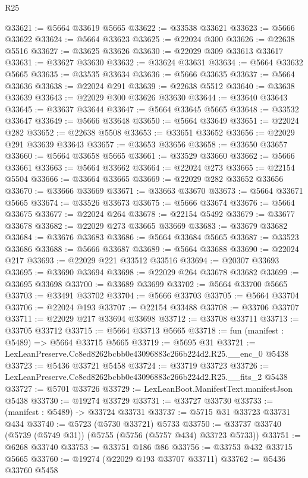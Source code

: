 \begin{lexlean}{R25}
\begin{coremodule}
@33621 := @5664 @33619 @5665
@33622 := @33538 @33621
@33623 := @5666 @33622
@33624 := @5664 @33623
@33625 := @22024 @300
@33626 := @22638 @5516
@33627 := @33625 @33626
@33630 := @22029 @309 @33613 @33617
@33631 := @33627 @33630
@33632 := @33624 @33631
@33634 := @5664 @33632 @5665
@33635 := @33535 @33634
@33636 := @5666 @33635
@33637 := @5664 @33636
@33638 := @22024 @291
@33639 := @22638 @5512
@33640 := @33638 @33639
@33643 := @22029 @300 @33626 @33630
@33644 := @33640 @33643
@33645 := @33637 @33644
@33647 := @5664 @33645 @5665
@33648 := @33532 @33647
@33649 := @5666 @33648
@33650 := @5664 @33649
@33651 := @22024 @282
@33652 := @22638 @5508
@33653 := @33651 @33652
@33656 := @22029 @291 @33639 @33643
@33657 := @33653 @33656
@33658 := @33650 @33657
@33660 := @5664 @33658 @5665
@33661 := @33529 @33660
@33662 := @5666 @33661
@33663 := @5664 @33662
@33664 := @22024 @273
@33665 := @22154 @5504
@33666 := @33664 @33665
@33669 := @22029 @282 @33652 @33656
@33670 := @33666 @33669
@33671 := @33663 @33670
@33673 := @5664 @33671 @5665
@33674 := @33526 @33673
@33675 := @5666 @33674
@33676 := @5664 @33675
@33677 := @22024 @264
@33678 := @22154 @5492
@33679 := @33677 @33678
@33682 := @22029 @273 @33665 @33669
@33683 := @33679 @33682
@33684 := @33676 @33683
@33686 := @5664 @33684 @5665
@33687 := @33523 @33686
@33688 := @5666 @33687
@33689 := @5664 @33688
@33690 := @22024 @217
@33693 := @22029 @221 @33512 @33516
@33694 := @20307 @33693
@33695 := @33690 @33694
@33698 := @22029 @264 @33678 @33682
@33699 := @33695 @33698
@33700 := @33689 @33699
@33702 := @5664 @33700 @5665
@33703 := @33491 @33702
@33704 := @5666 @33703
@33705 := @5664 @33704
@33706 := @22024 @193
@33707 := @22154 @33488
@33708 := @33706 @33707
@33711 := @22029 @217 @33694 @33698
@33712 := @33708 @33711
@33713 := @33705 @33712
@33715 := @5664 @33713 @5665
@33718 := fun (manifest : @5489) => @5664 @33715 @5665
@33719 := @5695 @31
@33721 := LexLeanPreserve.Cc8ed8262bcbb0e43096883c266b224d2.R25.__enc_0 @5438
@33723 := @5436 @33721 @5458
@33724 := @33719 @33723
@33726 := LexLeanPreserve.Cc8ed8262bcbb0e43096883c266b224d2.R25.__fits_2 @5438
@33727 := @5701 @33726
@33729 := LexLeanBoot.ManifestText.manifestJson @5438
@33730 := @19274 @33729
@33731 := @33727 @33730
@33733 := (manifest : @5489) -> @33724 @33731
@33737 := @5715 @31 @33723 @33731 @434
@33740 := @5723 (@5730 @33721) @5733
@33750 := @33737 @33740 (@5739 (@5749 @31)) (@5755 (@5756 (@5757 @434) @33723 @5733))
@33751 := @6268 @33740
@33753 := @33751 @186 @86
@33756 := @33753 @432 @33715 @5665
@33760 := @19274 (@22029 @193 @33707 @33711)
@33762 := @5436 @33760 @5458

\end{coremodule}
\end{lexlean}

